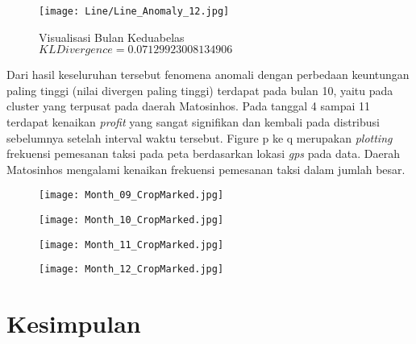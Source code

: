 \documentclass{article}
\begin{document}
\begin{figure}[H]
	\centering
	\texttt{[image: Line/Line\_Anomaly\_12.jpg]}
	\caption{Visualisasi Bulan Keduabelas\\$KL Divergence = 0.07129923008134906$}
\end{figure}

Dari hasil keseluruhan tersebut fenomena anomali dengan  perbedaan keuntungan paling tinggi (nilai divergen paling tinggi) terdapat pada bulan 10, yaitu pada cluster yang terpusat pada daerah Matosinhos. Pada tanggal 4 sampai 11 terdapat kenaikan \textit{profit} yang sangat signifikan dan kembali pada distribusi sebelumnya setelah interval waktu tersebut. Figure p ke q merupakan \textit{plotting} frekuensi pemesanan taksi pada peta berdasarkan lokasi \textit{gps} pada data. Daerah Matosinhos mengalami kenaikan frekuensi pemesanan taksi dalam jumlah besar.

\begin{figure}[H]
	\centering
	\begin{minipage}{.4\textwidth}
		\centering
		\texttt{[image: Month\_09\_CropMarked.jpg]}
	\end{minipage}%
	\hspace{.1\textwidth}
	\begin{minipage}{.4\textwidth}
		\centering
		\texttt{[image: Month\_10\_CropMarked.jpg]}
	\end{minipage}%
\end{figure}

\begin{figure}[H]
	\centering
	\begin{minipage}{.4\textwidth}
		\centering
		\texttt{[image: Month\_11\_CropMarked.jpg]}
	\end{minipage}%
	\hspace{.1\textwidth}
	\begin{minipage}{.4\textwidth}
		\centering
		\texttt{[image: Month\_12\_CropMarked.jpg]}
	\end{minipage}%
\end{figure}

\section{Kesimpulan}
\end{document}

